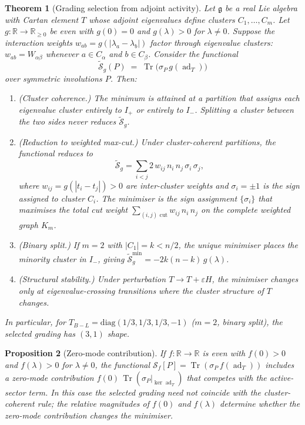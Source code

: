 \documentclass[11pt]{article}
\theoremstyle{plain}
\newtheorem{theorem}{Theorem}
\newtheorem{proposition}[theorem]{Proposition}
\theoremstyle{definition}
\theoremstyle{remark}
\newcommand{\TBL}{T_{B\!-\!L}}
\newcommand{\ad}{\operatorname{ad}}
\newcommand{\Tr}{\operatorname{Tr}}
\begin{document}
\begin{theorem}[Grading selection from adjoint activity]
\label{thm:selection}
Let $\mathfrak{g}$ be a real Lie algebra with Cartan element $T$
whose adjoint eigenvalues define clusters $C_1, \ldots, C_m$.
Let $g : \mathbb{R} \to \mathbb{R}_{\ge 0}$ be even with $g(0) = 0$
and $g(\lambda) > 0$ for $\lambda \ne 0$.  Suppose the interaction
weights $w_{ab} = g(|\lambda_a - \lambda_b|)$ \emph{factor through
eigenvalue clusters}: $w_{ab} = W_{\alpha\beta}$ whenever
$a \in C_\alpha$ and $b \in C_\beta$.  Consider the functional
\[
  \widetilde{\mathcal{S}}_g(P)
  \;=\;
  \Tr\bigl(\sigma_P\,g(\ad_T)\bigr)
\]
over symmetric involutions $P$.  Then:
\begin{enumerate}\itemsep2pt
  \item[(i)] \emph{(Cluster coherence.)}  The minimum is attained at
    a partition that assigns each eigenvalue cluster entirely to
    $I_+$ or entirely to $I_-$.  Splitting a cluster between the two
    sides never reduces $\widetilde{\mathcal{S}}_g$.
  \item[(ii)] \emph{(Reduction to weighted max-cut.)}  Under
    cluster-coherent partitions, the functional reduces to
    \begin{equation}\label{eq:weighted-cut}
      \widetilde{\mathcal{S}}_g
      = \sum_{i < j} 2\,w_{ij}\,n_i\,n_j\,\sigma_i\,\sigma_j,
    \end{equation}
    where $w_{ij} = g(|t_i - t_j|) > 0$ are inter-cluster weights
    and $\sigma_i = \pm 1$ is the sign assigned to cluster $C_i$.
    The minimiser is the sign assignment $\{\sigma_i\}$ that maximises
    the total cut weight $\sum_{(i,j) \text{ cut}} w_{ij}\,n_i\,n_j$
    on the complete weighted graph $K_m$.
  \item[(iii)] \emph{(Binary split.)}  If $m = 2$ with
    $|C_1| = k < n/2$, the unique minimiser places the minority
    cluster in $I_-$, giving
    $\widetilde{\mathcal{S}}_g^{\min} = -2k(n{-}k)\,g(\lambda)$.
  \item[(iv)] \emph{(Structural stability.)}  Under perturbation
    $T \to T + \varepsilon H$, the minimiser changes only at
    eigenvalue-crossing transitions where the cluster structure of
    $T$ changes.
\end{enumerate}
In particular, for $\TBL = \mathrm{diag}(1/3,1/3,1/3,-1)$ ($m = 2$,
binary split), the selected grading has $(3,1)$ shape.
\end{theorem}

\begin{proposition}[Zero-mode contribution]
\label{prop:zero-mode}
If $f : \mathbb{R} \to \mathbb{R}$ is even with $f(0) > 0$ and
$f(\lambda) > 0$ for $\lambda \ne 0$, the functional
$\mathcal{S}_f[P] = \Tr(\sigma_P\,f(\ad_T))$ includes a zero-mode
contribution $f(0)\,\Tr(\sigma_P|_{\ker\ad_T})$ that competes with
the active-sector term.  In this case the selected grading need not
coincide with the cluster-coherent rule; the relative magnitudes of
$f(0)$ and $f(\lambda)$ determine whether the zero-mode contribution
changes the minimiser.
\end{proposition}
\end{document}
